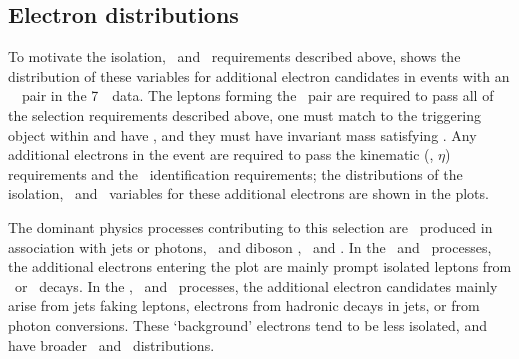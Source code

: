 \subsection{Electron distributions}

To motivate the isolation, \dzerosig\ and \zzero\ requirements described
above,  shows the distribution of these variables for additional
electron candidates in events with an \ossf\ \dilepton\ pair in the 7~\tev\ data. 
The leptons forming the \dilepton\ pair are required to pass all of
the selection requirements described above, one must match to the triggering
object within  and have , and they must have invariant mass satisfying \sstooos. Any additional electrons in the event are required to pass
the kinematic (\pt, $\eta$) requirements and the \loosePP\ identification
requirements; the distributions of the isolation, \dzerosig\ and \zzero\
variables for these additional electrons are shown in the plots. 

The dominant
physics processes contributing to this selection are \Zll\ produced in
association with jets or photons, \ttbar\ and diboson \WW, \WZ\ and \ZZ. In the
\WZ\ and \ZZ\ processes, the additional electrons entering the plot are mainly
prompt isolated leptons from \W\ or \Z\ decays. In the \Zll, \ttbar\ and \WW\
processes, the additional electron candidates mainly 
arise from jets faking leptons, electrons from hadronic decays in jets, or from
photon conversions. These `background' electrons tend to be less isolated, and
have broader \dzerosig\ and \zzero\ distributions.

